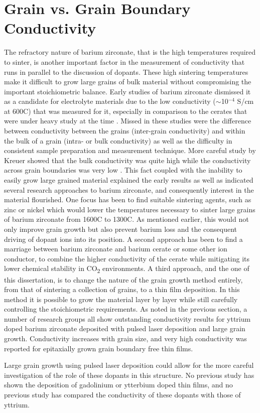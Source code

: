 \vspace{12pt}
\section{Grain vs. Grain Boundary Conductivity}The refractory nature of barium zirconate, that is the high temperatures required to sinter, is another important factor in the measurement of conductivity that runs in parallel to the discussion of dopants. These high sintering temperatures make it difficult to grow large grains of bulk material without compromising the important stoichiometric balance. Early studies of barium zirconate dismissed it as a candidate for electrolyte materials due to the low conductivity ($\sim$10$^{-4}$ S/cm at 600\textdegree C) that was measured for it, especially in comparison to the cerates that were under heavy study at the time \cite{Iwahara1993, MANTHIRAM1993, Slade1995}. Missed in these studies were the difference between conductivity between the grains (inter-grain conductivity) and within the bulk of a grain (intra- or bulk conductivity) as well as the difficulty in consistent sample preparation and measurement technique. More careful study by Kreuer showed that the bulk conductivity was quite high while the conductivity across grain boundaries was very low \cite{Kreuer1999}. This fact coupled with the inability to easily grow large grained material explained the early results as well as indicated several research approaches to barium zirconate, and consequently interest in the material flourished. One focus has been to find suitable sintering agents, such as zinc \cite{Babilo2007} or nickel \cite{Tong2010} which would lower the temperatures necessary to sinter large grains of barium zirconate from 1600\textdegree C to 1300\textdegree C. As mentioned earlier, this would not only improve grain growth but also prevent barium loss and the consequent driving of dopant ions into its position. A second approach has been to find a marriage between barium zirconate and barium cerate or some other ion conductor, to combine the higher conductivity of the cerate while mitigating its lower chemical stability in CO\textsubscript{2} environments. A third approach, and the one of this dissertation, is to change the nature of the grain growth method entirely, from that of sintering a collection of grains, to a thin film deposition. In this method it is possible to grow the material layer by layer while still carefully controlling the stoichiometric requirements. As noted in the previous section, a number of research groups \cite{Pergolesi2010, Kim2011, Shim2008} all show outstanding conductivity results for yttrium doped barium zirconate deposited with pulsed laser deposition and large grain growth. Conductivity increases with grain size, and very high conductivity was reported for epitaxially grown grain boundary free thin films. 

Large grain growth using pulsed laser deposition could allow for the more careful investigation of the role of these dopants in this structure. No previous study has shown the deposition of gadolinium or ytterbium doped thin films, and no previous study has compared the conductivity of these dopants with those of yttrium.